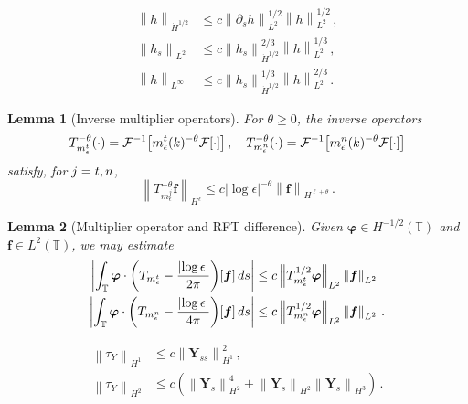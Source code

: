 \documentclass[10pt,a4paper]{amsart}
\newtheorem{lemma}{Lemma}
\newcommand{\T}{\mathbb{T}}
\newcommand{\Y}{\bm{Y}}
\newcommand{\abs}[1]{\left\lvert #1 \right\rvert}
\newcommand{\mc}[1]{\mathcal{#1}}
\newcommand{\norm}[1]{\left\lVert #1 \right\rVert}
\newcommand{\p}{\partial}
\begin{document}
\begin{equation}\label{eq:interps}
\begin{aligned}
  \norm{h}_{\dot H^{1/2}}&\le c\norm{\p_sh}_{L^2}^{1/2}\norm{h}_{L^2}^{1/2}\,,\\
%
  \norm{h_s}_{L^2}&\le c\norm{h_s}_{\dot H^{1/2}}^{2/3}\norm{h}_{L^2}^{1/3}\,,\\
  \norm{h}_{L^\infty} &\le c\norm{h_s}_{\dot H^{1/2}}^{1/3}\norm{h}_{L^2}^{2/3}\,.
\end{aligned}
\end{equation}

\begin{lemma}[Inverse multiplier operators]\label{lem:Tinverse}
  For $\theta\ge 0$, the inverse operators 
  \begin{equation}
    T_{m_\epsilon^{\rm t}}^{-\theta}(\cdot) = \mc{F}^{-1}\big[m_\epsilon^{\rm t}(k)^{-\theta}\mc{F}[\cdot]\big]\,, \quad
    T_{m_\epsilon^{\rm n}}^{-\theta}(\cdot) = \mc{F}^{-1}\big[m_\epsilon^{\rm n}(k)^{-\theta}\mc{F}[\cdot]\big]
  \end{equation}
satisfy, for $j={\rm t},{\rm n}$,
  \begin{equation}
    \norm{T_{m_\epsilon^j}^{-\theta}\bm{f}}_{H^\ell} \le c\abs{\log\epsilon}^{-\theta}\norm{\bm{f}}_{H^{\ell+\theta}}\,.
  \end{equation}
\end{lemma}

\begin{lemma}[Multiplier operator and RFT difference]\label{lem:mult_RFT_diff}
Given $\bm{\varphi}\in H^{-1/2}(\T)$ and $\bm{f}\in L^2(\T)$, we may estimate 
 \begin{equation}
  \begin{aligned}
  \abs{\int_\T\bm{\varphi}\cdot\bigg(T_{m_\epsilon^{\rm t}}-\frac{\abs{\log\epsilon}}{2\pi}\bigg)[\bm{f}]\,ds} 
  &\le c\norm{T_{m_\epsilon^{\rm t}}^{1/2}\bm{\varphi}}_{L^2}\norm{\bm{f}}_{L^2}\\
   \abs{\int_\T\bm{\varphi}\cdot\bigg(T_{m_\epsilon^{\rm n}}-\frac{\abs{\log\epsilon}}{4\pi}\bigg)[\bm{f}]\,ds} 
   &\le c\norm{T_{m_\epsilon^{\rm n}}^{1/2}\bm{\varphi}}_{L^2}\norm{\bm{f}}_{L^2}\,.
\end{aligned}
\end{equation}
\end{lemma}

\begin{equation}\label{eq:tauYbd}
\begin{aligned}
  \norm{\tau_Y}_{H^1} &\le c\norm{\Y_{ss}}_{H^1}^2 \,, \\
  \norm{\tau_Y}_{H^2}&\le c(\norm{\Y_s}_{H^2}^4 + \norm{\Y_s}_{H^2}\norm{\Y_s}_{H^3})\,.
\end{aligned}
\end{equation}
\end{document}
